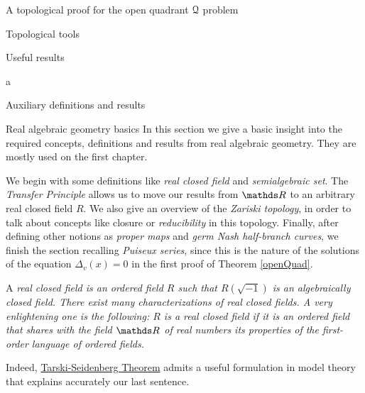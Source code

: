 \documentclass[11pt, a4paper, english, twoside, notitlepage, openright]{report}
\begin{document}
\begin{chapter}{A topological proof for the open quadrant $\mathcal{Q}$ problem}
\begin{section}{Topological tools}
\begin{subsection}{Useful results}
\begin{proposition}\label{propTop}
a
\end{proposition}

\end{subsection}

\end{section}

\end{chapter}

\appendix
\begin{chapter}{Auxiliary definitions and results}\label{AA}

\begin{section}{Real algebraic geometry basics}
In this section we give a basic insight into the required concepts, definitions and results from real algebraic geometry. They are mostly used on the first chapter.

We begin with some definitions like \emph{real closed field} and \emph{semialgebraic set}. The \emph{Transfer Principle} allows us to move our results from $\R$ to an arbitrary real closed field $R$. We also give an overview of the \emph{Zariski topology}, in order to talk about concepts like closure or \emph{reducibility} in this topology. Finally, after defining other notions as \emph{proper maps} and \emph{germ Nash half-branch curves}, we finish the section recalling \emph{Puiseux series}, since this is the nature of the solutions of the equation $\Delta_v(x)=0$ in the first proof of Theorem \ref{openQuad}.
\begin{definition}\label{realCField}
	A \em real closed field \em is an ordered field $R$ such that $R(\sqrt{-1})$ is an algebraically closed field. There exist many characterizations of real closed fields. A very enlightening one is the following: $R$ is a real closed field if it is an ordered field that shares with the field $\R$ of real numbers its properties of the first-order language of ordered fields. 
\end{definition}

Indeed, \hyperref[tarskiSeidenberg]{Tarski-Seidenberg Theorem} admits a useful formulation in model theory that explains accurately our last sentence.


\end{section}
\end{chapter}
\end{document}
